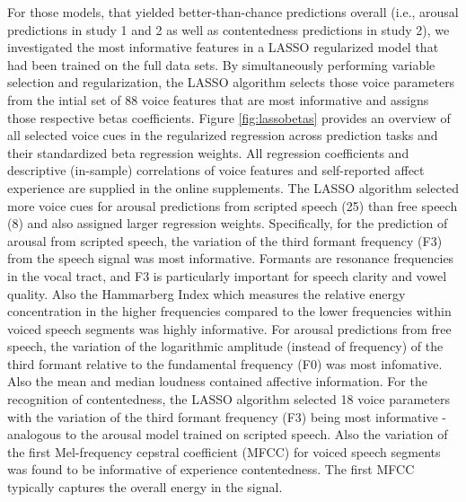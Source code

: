 \documentclass[
  english,
  man,floatsintext]{apa6}
\begin{document}
For those models, that yielded better-than-chance predictions overall (i.e., arousal predictions in study 1 and 2 as well as contentedness predictions in study 2), we investigated the most informative features in a LASSO regularized model that had been trained on the full data sets. By simultaneously performing variable selection and regularization, the LASSO algorithm selects those voice parameters from the intial set of 88 voice features that are most informative and assigns those respective betas coefficients. Figure \ref{fig:lassobetas} provides an overview of all selected voice cues in the regularized regression across prediction tasks and their standardized beta regression weights. All regression coefficients and descriptive (in-sample) correlations of voice features and self-reported affect experience are supplied in the online supplements.
The LASSO algorithm selected more voice cues for arousal predictions from scripted speech (25) than free speech (8) and also assigned larger regression weights.
Specifically, for the prediction of arousal from scripted speech, the variation of the third formant frequency (F3) from the speech signal was most informative. Formants are resonance frequencies in the vocal tract, and F3 is particularly important for speech clarity and vowel quality. Also the Hammarberg Index which measures the relative energy concentration in the higher frequencies compared to the lower frequencies within voiced speech segments was highly informative.
For arousal predictions from free speech, the variation of the logarithmic amplitude (instead of frequency) of the third formant relative to the fundamental frequency (F0) was most infomative. Also the mean and median loudness contained affective information.
For the recognition of contentedness, the LASSO algorithm selected 18 voice parameters with the variation of the third formant frequency (F3) being most informative - analogous to the arousal model trained on scripted speech. Also the variation of the first Mel-frequency cepstral coefficient (MFCC) for voiced speech segments was found to be informative of experience contentedness. The first MFCC typically captures the overall energy in the signal.
\end{document}
